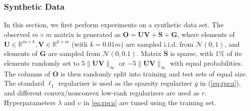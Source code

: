 \documentclass[10pt,journal,compsoc]{IEEEtran}
\def \R{\mathbb R}
\newcommand{\NM}[2]{\| #1 \|_{#2} }
\begin{document}

\subsubsection{Synthetic Data}
\label{sec:synrpca}

In this section, 
we first perform experiments on a synthetic data set.  The observed $m \times m$ matrix is
generated as $\mathbf{O} = \mathbf{U} \mathbf{V} + \tilde{\mathbf{S}} + \mathbf{G}$, where
elements  of
$\mathbf{U} \in \R^{m \times k}, \mathbf{V} \in \R^{k \times m}$ (with $k = 0.01m$) are 
sampled i.i.d. from $\mathcal{N}(0, 1)$,
and elements of $\mathbf{G}$ are sampled from $\mathcal{N}(0, 0.1)$.  
Matrix $\tilde{\mathbf{S}}$ is sparse, 
with $1\%$ of its elements randomly set to $5 \NM{\mathbf{U} \mathbf{V}}{\infty}$  or $- 5 \NM{\mathbf{U} \mathbf{V}}{\infty}$ with equal probabilities. 
The columns of $\mathbf{O}$ is then randomly split into training and test sets of equal size.
The standard $\ell_1$
regularizer
is 
used as the sparsity regularizer $g$ in (\ref{eq:rpca}), and
different convex/nonconvex low-rank regularizers are used as $r$.
Hyperparameters $\lambda$ and $\upsilon$ in \eqref{eq:rpca}
are tuned using the training set.  
\end{document}
